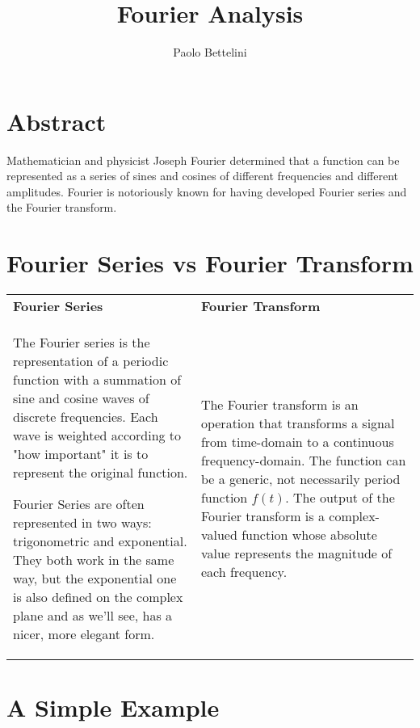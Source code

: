 \documentclass{article}
\title{Fourier Analysis}
\author{Paolo Bettelini}
\date{}
\begin{document}
\maketitle
\tableofcontents
\pagebreak

\section{Abstract}

Mathematician and physicist Joseph Fourier determined that a function can be represented as a series of sines and cosines of different frequencies and different amplitudes.
Fourier is notoriously known for having developed Fourier series and the Fourier transform.

\pagebreak

\section{Fourier Series vs Fourier Transform}

\begin{center}
    \begin{tabular}{ p{8cm}|p{8cm} }
        \textbf{Fourier Series} & \textbf{Fourier Transform} \\
        
        The Fourier series is the representation of a
        periodic function with a summation of sine and
        cosine waves of discrete frequencies.
        Each wave is weighted according to "how important"
        it is to represent the original function.
        
        Fourier Series are often represented in two ways:
        trigonometric and exponential.
        They both work in the same way,
        but the exponential one is also defined on the complex
        plane and as we'll see, has a nicer, more elegant form.
        &
        The Fourier transform is an operation that transforms
        a signal from time-domain to a continuous
        frequency-domain. The function can be a generic,
        not necessarily period function \(f(t)\).
        The output of the Fourier transform is a complex-valued
        function whose absolute value represents the magnitude of each frequency.
    \end{tabular}
\end{center}

\pagebreak

\section{A Simple Example}
\end{document}
